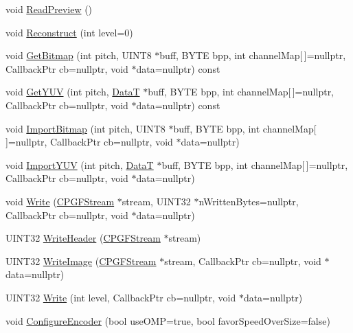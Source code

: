 \begin{DoxyCompactItemize}
\item 
void \mbox{\hyperlink{classCPGFImage_a126846c7265783e14da0f4dde6c9346b}{Read\+Preview}} ()
\item 
void \mbox{\hyperlink{classCPGFImage_abf906b469e11800e819db00009255b90}{Reconstruct}} (int level=0)
\item 
void \mbox{\hyperlink{classCPGFImage_a6a79885f55b60739b16fb961efb041ce}{Get\+Bitmap}} (int pitch, U\+I\+N\+T8 $\ast$buff, B\+Y\+TE bpp, int channel\+Map\mbox{[}$\,$\mbox{]}=nullptr, Callback\+Ptr cb=nullptr, void $\ast$data=nullptr) const
\item 
void \mbox{\hyperlink{classCPGFImage_a37c2f9a6b99c0e0b3564433e21f88e9b}{Get\+Y\+UV}} (int pitch, \mbox{\hyperlink{PGFtypes_8h_acb1ee3f52ccfad782dcaa0abd79e5d05}{DataT}} $\ast$buff, B\+Y\+TE bpp, int channel\+Map\mbox{[}$\,$\mbox{]}=nullptr, Callback\+Ptr cb=nullptr, void $\ast$data=nullptr) const
\item 
void \mbox{\hyperlink{classCPGFImage_a3c0895f4738c5222de1920c941a71541}{Import\+Bitmap}} (int pitch, U\+I\+N\+T8 $\ast$buff, B\+Y\+TE bpp, int channel\+Map\mbox{[}$\,$\mbox{]}=nullptr, Callback\+Ptr cb=nullptr, void $\ast$data=nullptr)
\item 
void \mbox{\hyperlink{classCPGFImage_a5685c45a74b14b9f12ee2d81f49718f3}{Import\+Y\+UV}} (int pitch, \mbox{\hyperlink{PGFtypes_8h_acb1ee3f52ccfad782dcaa0abd79e5d05}{DataT}} $\ast$buff, B\+Y\+TE bpp, int channel\+Map\mbox{[}$\,$\mbox{]}=nullptr, Callback\+Ptr cb=nullptr, void $\ast$data=nullptr)
\item 
void \mbox{\hyperlink{classCPGFImage_acd13d233dceaeefce3def7d71ebf4f82}{Write}} (\mbox{\hyperlink{classCPGFStream}{C\+P\+G\+F\+Stream}} $\ast$stream, U\+I\+N\+T32 $\ast$n\+Written\+Bytes=nullptr, Callback\+Ptr cb=nullptr, void $\ast$data=nullptr)
\item 
U\+I\+N\+T32 \mbox{\hyperlink{classCPGFImage_a1d853cd049417f0afc9a868664d7134d}{Write\+Header}} (\mbox{\hyperlink{classCPGFStream}{C\+P\+G\+F\+Stream}} $\ast$stream)
\item 
U\+I\+N\+T32 \mbox{\hyperlink{classCPGFImage_a0f0657eaf1a62ab14c01834e5c7adb07}{Write\+Image}} (\mbox{\hyperlink{classCPGFStream}{C\+P\+G\+F\+Stream}} $\ast$stream, Callback\+Ptr cb=nullptr, void $\ast$data=nullptr)
\item 
U\+I\+N\+T32 \mbox{\hyperlink{classCPGFImage_a9a0ef3ad10c8a14b2b9a8d6153387ffe}{Write}} (int level, Callback\+Ptr cb=nullptr, void $\ast$data=nullptr)
\item 
void \mbox{\hyperlink{classCPGFImage_a3215ac6bee3c5f6bb7e1c4b7fc53a4a2}{Configure\+Encoder}} (bool use\+O\+MP=true, bool favor\+Speed\+Over\+Size=false)

\end{DoxyCompactItemize}

